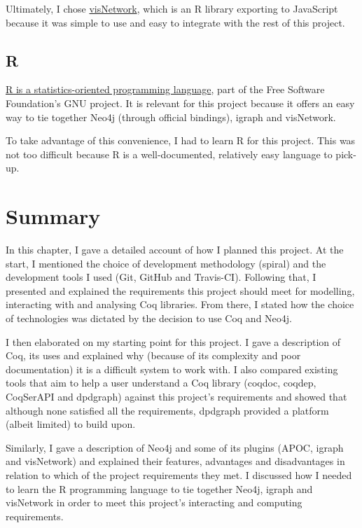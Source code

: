 Ultimately, I chose
\href{http://datastorm-open.github.io/visNetwork}{visNetwork}, which is an R
library exporting to JavaScript because it was simple to use and easy to
integrate with the rest of this project.

\subsection{R}\label{subsec:R}

\href{http://www.r-project.org}{R is a statistics-oriented programming
language}, part of the Free Software Foundation's GNU project. It is relevant for
this project because it offers an easy way to tie together Neo4j (through
official bindings), igraph and visNetwork.

To take advantage of this convenience, I had to learn R for this project. This
was not too difficult because R is a well-documented, relatively easy language
to pick-up.

\newpage
\section{Summary}

In this chapter, I gave a detailed account of how I planned this project. At the
start, I mentioned the choice of development methodology (spiral) and the
development tools I used (Git, GitHub and Travis-CI). Following that, I
presented and explained the requirements this project should meet for modelling,
interacting with and analysing Coq libraries. From there, I stated how the
choice of technologies was dictated by the decision to use Coq and Neo4j.

I then elaborated on my starting point for this project. I gave a description of
Coq, its uses and explained why (because of its complexity and poor documentation) it is a
difficult system to work with. I also compared existing tools that aim to help a
user understand a Coq library (coqdoc, coqdep, CoqSerAPI and dpdgraph) against
this project's requirements and showed that although none satisfied all the
requirements, dpdgraph provided a platform (albeit limited) to build upon.

Similarly, I gave a description of Neo4j and some of its plugins (APOC, igraph
and visNetwork) and explained their features, advantages and disadvantages in
relation to which of the project requirements they met. I discussed how I needed
to learn the R programming language to tie together Neo4j, igraph and visNetwork
in order to meet this project's interacting and computing requirements.
